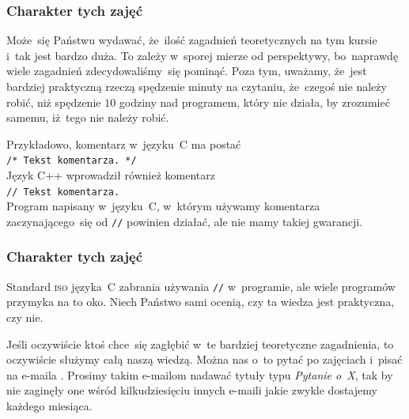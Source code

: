 \documentclass[10pt,t]{beamer}
\begin{document}
\begin{frame}
  \frametitle{Charakter tych zajęć}


  Może~się Państwu wydawać, że~ilość zagadnień teoretycznych na tym kursie
  i~tak jest bardzo duża. To zależy w~sporej mierze od perspektywy,
  bo~naprawdę wiele zagadnień zdecydowaliśmy~się pominąć. Poza tym,
  uważamy, że~jest bardziej praktyczną rzeczą spędzenie minuty na
  czytaniu, że~czegoś nie należy robić, niż spędzenie $10$ godziny nad
  programem, który nie działa, by zrozumieć samemu, iż~tego nie należy
  robić.

  Przykładowo, komentarz w~języku~C ma postać \\
  \texttt{/* Tekst komentarza. */} \\
  Język C++ wprowadził również komentarz \\
  \texttt{// Tekst komentarza.} \\
  Program napisany w~języku~C, w~którym używamy komentarza zaczynającego~się
  od \texttt{//} \alert{powinien} działać, ale \alert{nie mamy takiej
    gwarancji}.

\end{frame}





\begin{frame}
  \frametitle{Charakter tych zajęć}


  Standard \textsc{iso} języka~C zabrania używania
  \texttt{//} w~programie, ale wiele programów przymyka na to oko.
  Niech Państwo sami ocenią, czy ta wiedza jest praktyczna, czy nie.

  Jeśli oczywiście ktoś chce~się zagłębić w~te bardziej teoretyczne
  zagadnienia, to oczywiście służymy całą naszą wiedzą. Można
  nas o~to pytać po zajęciach i~pisać na e-maila \email.
  Prosimy takim e-mailom nadawać tytuły typu \textit{Pytanie o~X}, tak by
  nie zaginęły one wśród kilkudziesięciu innych e-maili jakie zwykle
  dostajemy każdego miesiąca.

\end{frame}
















\end{document}

